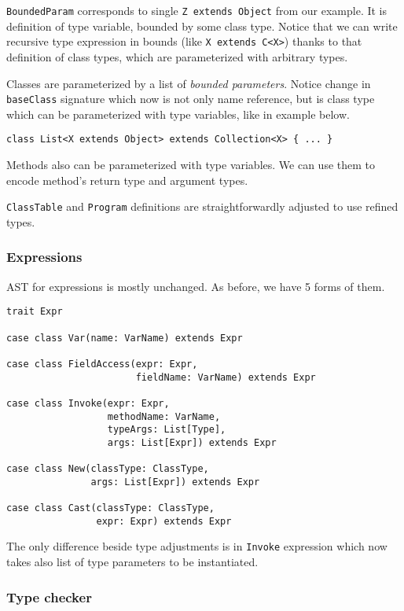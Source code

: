 \documentclass{article}[12pt]
\begin{document}
\texttt{BoundedParam} corresponds to single
\texttt{Z extends Object} from our example. It is definition
of type variable, bounded by some class type. Notice that we
can write recursive type expression in bounds
(like \texttt{X extends C<X>}) thanks to that definition of class
types, which are parameterized with arbitrary types.

Classes are parameterized by a list of \emph{bounded parameters}.
Notice change in \texttt{baseClass} signature which now is not
only name reference, but is class type which can be parameterized
with type variables, like in example below.

\begin{verbatim}
class List<X extends Object> extends Collection<X> { ... }
\end{verbatim}

Methods also can be parameterized with type variables. We can use
them to encode method's return type and argument types.

\texttt{ClassTable} and \texttt{Program} definitions are
straightforwardly adjusted to use refined types.

\subsubsection{Expressions}

AST for expressions is mostly unchanged. As before, we have 5
forms of them.

\begin{verbatim}
trait Expr

case class Var(name: VarName) extends Expr

case class FieldAccess(expr: Expr,
                       fieldName: VarName) extends Expr

case class Invoke(expr: Expr,
                  methodName: VarName,
                  typeArgs: List[Type],
                  args: List[Expr]) extends Expr

case class New(classType: ClassType,
               args: List[Expr]) extends Expr

case class Cast(classType: ClassType,
                expr: Expr) extends Expr
\end{verbatim}

The only difference beside type adjustments is in \texttt{Invoke}
expression which now takes also list of type parameters to be
instantiated.

\subsubsection{Type checker}
\end{document}
